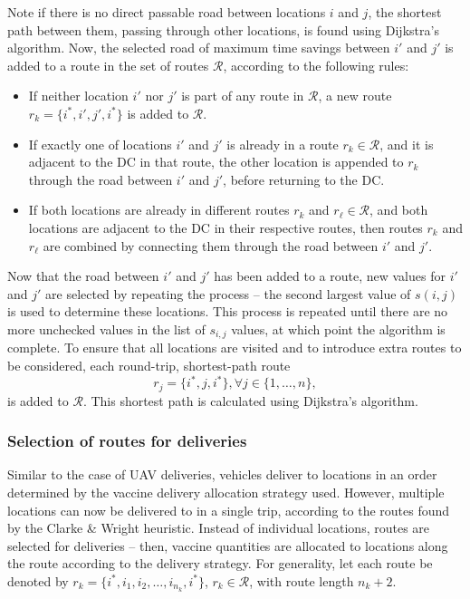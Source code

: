 Note if there is no direct passable road between locations $i$ and $j$, the shortest path between them, passing through other locations, is found using Dijkstra's algorithm. Now, the selected road of maximum time savings between $i'$ and $j'$ is added to a route in the set of routes $\mathcal{R}$, according to the following rules:
\begin{itemize}
    \item If neither location $i'$ nor $j'$ is part of any route in $\mathcal{R}$, a new route $r_{k} = \{i^{*},i',j',i^{*}\}$ is added to $\mathcal{R}$.
    \item If exactly one of locations $i'$ and $j'$ is already in a route $r_{k} \in \mathcal{R}$, and it is adjacent to the DC in that route, the other location is appended to $r_{k}$ through the road between $i'$ and $j'$, before returning to the DC.
    \item If both locations are already in different routes $r_{k}$ and $r_{\ell} \in \mathcal{R}$, and both locations are adjacent to the DC in their respective routes, then routes $r_{k}$ and $r_{\ell}$ are combined by connecting them through the road between $i'$ and $j'$.
\end{itemize}

Now that the road between $i'$ and $j'$ has been added to a route, new values for $i'$ and $j'$ are selected by repeating the process -- the second largest value of $s(i,j)$ is used to determine these locations. This process is repeated until there are no more unchecked values in the list of $s_{i,j}$ values, at which point the algorithm is complete. To ensure that all locations are visited and to introduce extra routes to be considered, each round-trip, shortest-path route $$r_{j} = \{i^{*}, j, i^{*}\}, \forall{j} \in \{1,\dots,n\},$$ is added to $\mathcal{R}$. This shortest path is calculated using Dijkstra's algorithm. 

\subsubsection{Selection of routes for deliveries}
Similar to the case of UAV deliveries, vehicles deliver to locations in an order determined by the vaccine delivery allocation strategy used. However, multiple locations can now be delivered to in a single trip, according to the routes found by the Clarke \& Wright heuristic. Instead of individual locations, routes are selected for deliveries -- then, vaccine quantities are allocated to locations along the route according to the delivery strategy. For generality, let each route be denoted by $r_{k} = \{i^{*},i_{1},i_{2},\dots,i_{n_{k}},i^{*}\}$, $r_{k} \in \mathcal{R}$, with route length $n_{k} + 2$. 

